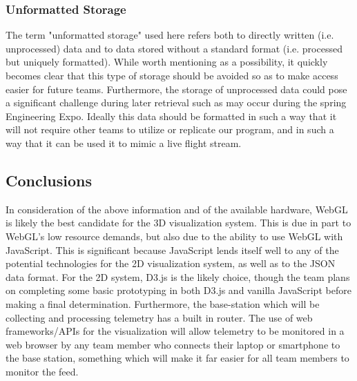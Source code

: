\documentclass[onecolumn, draftclsnofoot,10pt, compsoc]{IEEEtran}
\begin{document}
	\subsubsection{Unformatted Storage}
		The term "unformatted storage" used here refers both to directly written (i.e. unprocessed) data and to data stored without a standard format (i.e. processed but uniquely formatted).
		While worth mentioning as a possibility, it quickly becomes clear that this type of storage should be avoided so as to make access easier for future teams.
		Furthermore, the storage of unprocessed data could pose a significant challenge during later retrieval such as may occur during the spring Engineering Expo.
		Ideally this data should be formatted in such a way that it will not require other teams to utilize or replicate our program, and in such a way that it can be used it to mimic a live flight stream.
		
\subsection{Conclusions}
	In consideration of the above information and of the available hardware, WebGL is likely the best candidate for the 3D visualization system.
	This is due in part to WebGL's low resource demands, but also due to the ability to use WebGL with JavaScript.
	This is significant because JavaScript lends itself well to any of the potential technologies for the 2D visualization system, as well as to the JSON data format.
	For the 2D system, D3.js is the likely choice, though the team plans on completing some basic prototyping in both D3.js and vanilla JavaScript before making a final determination.
	Furthermore, the base-station which will be collecting and processing telemetry has a built in router.
	The use of web frameworks/APIs for the visualization will allow telemetry to be monitored in a web browser by any team member who connects their laptop or smartphone to the base station, something which will make it far easier for all team members to monitor the feed. 
	



\newpage


\end{document}
